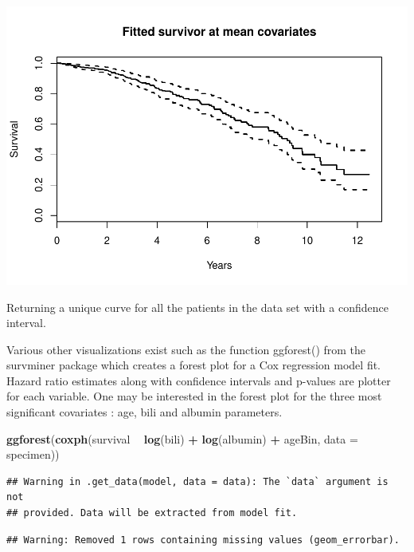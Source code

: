 \documentclass[]{article}
\newenvironment{Shaded}{\begin{snugshade}}{\end{snugshade}}
\newcommand{\KeywordTok}[1]{\textcolor[rgb]{0.13,0.29,0.53}{\textbf{#1}}}
\newcommand{\DataTypeTok}[1]{\textcolor[rgb]{0.13,0.29,0.53}{#1}}
\newcommand{\StringTok}[1]{\textcolor[rgb]{0.31,0.60,0.02}{#1}}
\newcommand{\OperatorTok}[1]{\textcolor[rgb]{0.81,0.36,0.00}{\textbf{#1}}}
\newcommand{\NormalTok}[1]{#1}
\begin{document}
\includegraphics{report_files/figure-latex/unnamed-chunk-21-2.pdf}

Returning a unique curve for all the patients in the data set with a
confidence interval.

Various other visualizations exist such as the function ggforest() from
the survminer package which creates a forest plot for a Cox regression
model fit. Hazard ratio estimates along with confidence intervals and
p-values are plotter for each variable. One may be interested in the
forest plot for the three most significant covariates : age, bili and
albumin parameters.

\begin{Shaded}
\begin{Highlighting}[]
\KeywordTok{ggforest}\NormalTok{(}\KeywordTok{coxph}\NormalTok{(survival }\OperatorTok{~}\StringTok{ }\KeywordTok{log}\NormalTok{(bili) }\OperatorTok{+}\StringTok{ }\KeywordTok{log}\NormalTok{(albumin) }\OperatorTok{+}\StringTok{ }\NormalTok{ageBin, }\DataTypeTok{data =}\NormalTok{ specimen))}
\end{Highlighting}
\end{Shaded}

\begin{verbatim}
## Warning in .get_data(model, data = data): The `data` argument is not
## provided. Data will be extracted from model fit.
\end{verbatim}

\begin{verbatim}
## Warning: Removed 1 rows containing missing values (geom_errorbar).
\end{verbatim}
\end{document}
